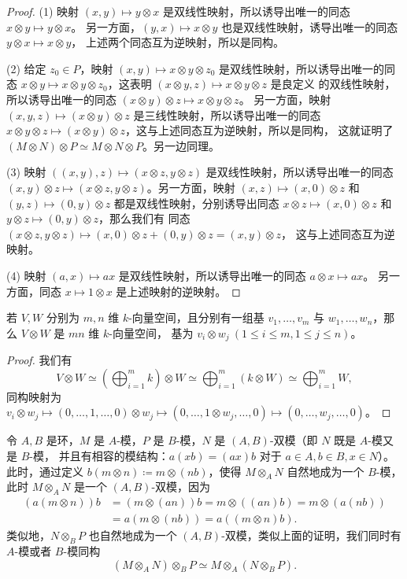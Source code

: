 \begin{proof}
  (1) 映射 $(x,y)\mapsto y\otimes x$ 是双线性映射，所以诱导出唯一的同态 $x\otimes y\mapsto y\otimes x$。
  另一方面，$(y,x)\mapsto x\otimes y$ 也是双线性映射，诱导出唯一的同态 $y\otimes x\mapsto x\otimes y$，
  上述两个同态互为逆映射，所以是同构。

  (2) 给定 $z_0\in P$，映射 $(x,y)\mapsto x\otimes y\otimes z_0$ 是双线性映射，所以诱导出唯一的同态
  $x\otimes y\mapsto x\otimes y\otimes z_0$，这表明 $(x\otimes y,z)\mapsto x\otimes y\otimes z$ 是良定义
  的双线性映射，所以诱导出唯一的同态 $(x\otimes y)\otimes z\mapsto x\otimes y\otimes z$。
  另一方面，映射 $(x,y,z)\mapsto (x\otimes y)\otimes z$ 是三线性映射，所以诱导出唯一的同态
  $x\otimes y\otimes z\mapsto (x\otimes y)\otimes z$，这与上述同态互为逆映射，所以是同构，
  这就证明了 $(M\otimes N)\otimes P\simeq M\otimes N\otimes P$。另一边同理。

  (3) 映射 $((x,y),z)\mapsto (x\otimes z,y\otimes z)$ 是双线性映射，所以诱导出唯一的同态
  $(x,y)\otimes z\mapsto (x\otimes z,y\otimes z)$。另一方面，映射 $(x,z)\mapsto (x,0)\otimes z$
  和 $(y,z)\mapsto (0,y)\otimes z$ 都是双线性映射，分别诱导出同态
  $x\otimes z\mapsto (x,0)\otimes z$ 和 $y\otimes z\mapsto (0,y)\otimes z$，那么我们有
  同态 $(x\otimes z,y\otimes z)\mapsto (x,0)\otimes z+(0,y)\otimes z=(x,y)\otimes z$，
  这与上述同态互为逆映射。

  (4) 映射 $(a,x)\mapsto ax$ 是双线性映射，所以诱导出唯一的同态 $a\otimes x\mapsto ax$。
  另一方面，同态 $x\mapsto 1\otimes x$ 是上述映射的逆映射。
\end{proof}

\begin{corollary}\label{coro:tensor product of vector space}
  若 $V,W$ 分别为 $m,n$ 维 $k$-向量空间，且分别有一组基
  $v_1,\dots,v_m$ 与 $w_1,\dots,w_n$，那么 $V\otimes W$ 是 $mn$ 维 $k$-向量空间，
  基为 $v_i\otimes w_j\ (1\leq i\leq m,1\leq j\leq n)$。
\end{corollary}
\begin{proof}
  我们有
  \[
    V\otimes W\simeq\left(\bigoplus_{i=1}^m k\right)  \otimes W\simeq
    \bigoplus_{i=1}^m (k\otimes W)\simeq \bigoplus_{i=1}^m W,
  \]
  同构映射为 $v_i\otimes w_j\mapsto (0,\dots,1,\dots,0)\otimes w_j\mapsto (0,\dots,1\otimes w_j,\dots,0)\mapsto 
  (0,\dots,w_j,\dots,0)$。
\end{proof}

令 $A,B$ 是环，$M$ 是 $A$-模，$P$ 是 $B$-模，$N$ 是 $(A,B)$-双模（即 $N$ 既是 $A$-模又是 $B$-模，
并且有相容的模结构：$a(xb)=(ax)b$ 对于 $a\in A,b\in B,x\in N$）。此时，通过定义 
$b(m\otimes n)\coloneqq m\otimes (nb)$，使得 $M\otimes_AN$ 自然地成为一个 $B$-模，
此时 $M\otimes_AN$ 是一个 $(A,B)$-双模，因为
\begin{align*}
  (a(m\otimes n))b&= (m\otimes (an))b=m\otimes((an)b)=
  m\otimes(a(nb))\\&=a(m\otimes(nb))=a((m\otimes n)b).
\end{align*}
类似地，$N\otimes_BP$ 也自然地成为一个 $(A,B)$-双模，类似上面的证明，我们同时有
$A$-模或者 $B$-模同构
\[
  (M\otimes_AN)\otimes_BP \simeq M\otimes_A(N\otimes_B P). 
\]

